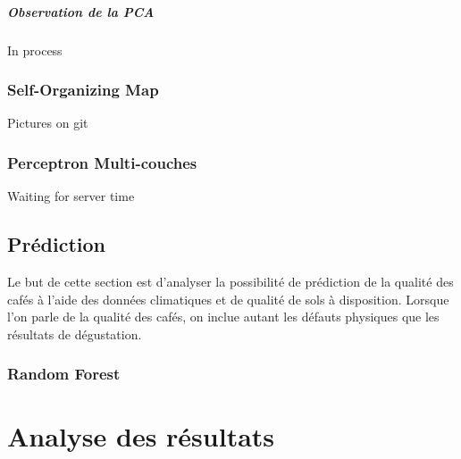 \paragraph{Observation de la PCA }
In process







\newpage
\subsection{Self-Organizing Map}
Pictures on git





\newpage
\subsection{Perceptron Multi-couches}
Waiting for server time



\section{Prédiction}
Le but de cette section est d'analyser la possibilité de prédiction de la qualité des cafés à l'aide des données climatiques et de qualité de sols à disposition. Lorsque l'on parle de la qualité des cafés, on inclue autant les défauts physiques que les résultats de dégustation. 



\subsection{Random Forest}



\chapter{Analyse des résultats}



